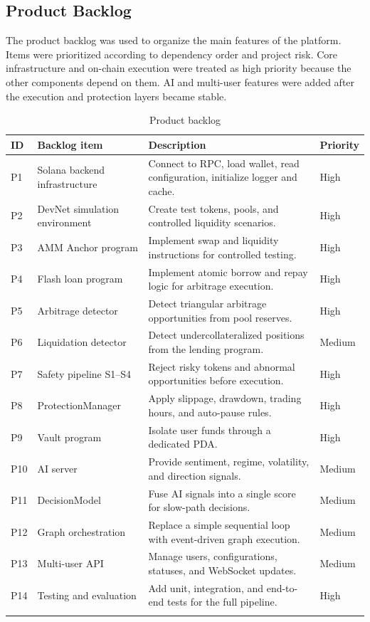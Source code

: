 \documentclass[12pt,a4paper]{report}
\begin{document}
\subsection{Product Backlog}

The product backlog was used to organize the main features of the platform. Items were prioritized according to dependency order and project risk. Core infrastructure and on-chain execution were treated as high priority because the other components depend on them. AI and multi-user features were added after the execution and protection layers became stable.

\begin{longtable}{p{1.4cm}p{4.6cm}p{6.1cm}p{2cm}}
\toprule
\textbf{ID} & \textbf{Backlog item} & \textbf{Description} & \textbf{Priority} \\
\midrule
P1 & Solana backend infrastructure & Connect to RPC, load wallet, read configuration, initialize logger and cache. & High \\
P2 & DevNet simulation environment & Create test tokens, pools, and controlled liquidity scenarios. & High \\
P3 & AMM Anchor program & Implement swap and liquidity instructions for controlled testing. & High \\
P4 & Flash loan program & Implement atomic borrow and repay logic for arbitrage execution. & High \\
P5 & Arbitrage detector & Detect triangular arbitrage opportunities from pool reserves. & High \\
P6 & Liquidation detector & Detect undercollateralized positions from the lending program. & Medium \\
P7 & Safety pipeline S1--S4 & Reject risky tokens and abnormal opportunities before execution. & High \\
P8 & ProtectionManager & Apply slippage, drawdown, trading hours, and auto-pause rules. & High \\
P9 & Vault program & Isolate user funds through a dedicated PDA. & High \\
P10 & AI server & Provide sentiment, regime, volatility, and direction signals. & Medium \\
P11 & DecisionModel & Fuse AI signals into a single score for slow-path decisions. & Medium \\
P12 & Graph orchestration & Replace a simple sequential loop with event-driven graph execution. & Medium \\
P13 & Multi-user API & Manage users, configurations, statuses, and WebSocket updates. & Medium \\
P14 & Testing and evaluation & Add unit, integration, and end-to-end tests for the full pipeline. & High \\
\bottomrule
\caption{Product backlog}
\label{tab:backlog}
\end{longtable}
\end{document}

